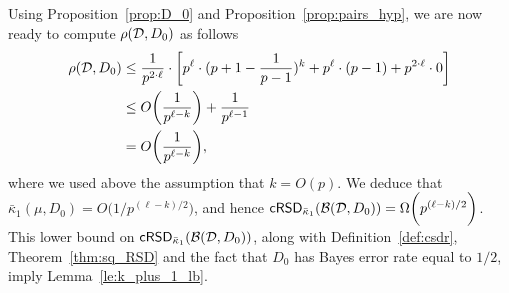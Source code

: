 Using Proposition~\ref{prop:D_0} and Proposition~\ref{prop:pairs_hyp}, we are now ready to compute $\rho(\mathcal{D},D_0)$ as follows
\begin{align*}
\rho(\mathcal{D},D_0) &\le \frac{1}{p^{2\cdot \ell}} \cdot \bigg[ p^{\ell} \cdot (p+1-\frac{1}{p-1})^k +p^{\ell} \cdot (p-1) + p^{2\cdot \ell} \cdot 0 \bigg]\\
&\le O\bigg(\frac{1}{p^{\ell-k}}\bigg) + \frac{1}{p^{\ell-1}}\\
&= O\bigg(\frac{1}{p^{\ell-k}}\bigg),
\end{align*}
where we used above the assumption that $k = O(p)$. We deduce that $\bar{\kappa}_1(\mu,D_0)  = O\bigg(1/p^{(\ell-k)/2}\bigg)$, and hence $\mathsf{cRSD}_{\bar{\kappa}_1}(\mathcal{B}(\mathcal{D},D_0)) = \Omega\bigg(p^{(\ell-k)/2}\bigg)$. This lower bound on $\mathsf{cRSD}_{\bar{\kappa}_1}(\mathcal{B}(\mathcal{D},D_0))$, along with Definition~\ref{def:csdr}, Theorem~\ref{thm:sq_RSD} and the fact that $D_0$ has Bayes error rate equal to $1/2$, imply Lemma~\ref{le:k_plus_1_lb}.



\iffalse
In order to prove \Cref{le:recovery}, we will need the following straightforward propositions.

\begin{proposition}\label{prop:frac_lb}
	For any positive real numbers $N$, $D$ and $\tau$ such that $\tau = o(N)$ and $\tau = o(D)$, we have that
	\begin{equation*}
	\frac{N-\tau}{D+\tau} \geq \frac{N}{D} \cdot (1-o(1)).
	\end{equation*}
\end{proposition}

\begin{proposition}\label{prop:frac_ub}
	For any positive real numbers $N$, $D$ and $\tau$ such that $\tau = o(D)$, we have that
	\begin{equation*}
	\frac{N+\tau}{D-\tau} \le \frac{N}{D} \cdot (1+o(1)) + o(1).
	\end{equation*}	
\end{proposition}

\begin{proposition}\label{prop:tau_i_ub}
	For every $i \in [k+1]$, we have that $\tau_i = o_c(1)$.
\end{proposition}
\begin{proposition}\label{prop:bd_tau_v_tau_i}
	If $v > \epsilon^{k+1}/2$, then for every $i \in [k+1]$, we have that
	\begin{equation*}
	\tau = o_c \bigg( (v \cdot \tau_i - \tau ) \cdot (1-\tau_i/4)\bigg).
	\end{equation*}
\end{proposition}

The proof of \Cref{prop:bd_tau_v_tau_i} follows from the definitions of $\tau$ and $\tau_i$ in \Cref{alg:k_wise_SQ}.
\fi
